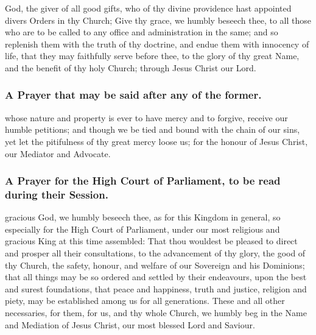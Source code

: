  God, the giver of all good gifts, who of thy divine providence hast appointed divers Orders in thy Church; Give thy grace, we humbly beseech thee, to all those who are to be called to any office and administration in the same; and so replenish them with the truth of thy doctrine, and endue them with innocency of life, that they may faithfully serve before thee, to the glory of thy great Name, and the benefit of thy holy Church; through Jesus Christ our Lord.

\subsubsection{A Prayer that may be said after any of the former.}
 whose nature and property is ever to have mercy and to forgive, receive our humble petitions; and though we be tied and bound with the chain of our sins, yet let the pitifulness of thy great mercy loose us; for the honour of Jesus Christ, our Mediator and Advocate.

\subsubsection{A Prayer for the High Court of Parliament, to be read during their Session.}
 gracious God, we humbly beseech thee, as for this Kingdom in general, so especially for the High Court of Parliament, under our most religious and gracious King at this time assembled: That thou wouldest be pleased to direct and prosper all their consultations, to the advancement of thy glory, the good of thy Church, the safety, honour, and welfare of our Sovereign and his Dominions; that all things may be so ordered and settled by their endeavours, upon the best and surest foundations, that peace and happiness, truth and justice, religion and piety, may be established among us for all generations. These and all other necessaries, for them, for us, and thy whole Church, we humbly beg in the Name and Mediation of Jesus Christ, our most blessed Lord and Saviour.

\newpage

